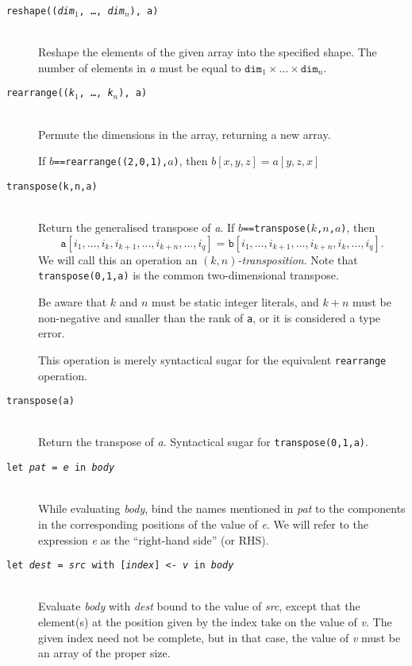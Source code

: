 \documentclass[oneside]{memoir}
\begin{document}
\begin{description}
  \item[\texttt{reshape((\textit{dim}$_{1}$, \ldots, \textit{dim}$_{n}$), a)}]\hfill\\
    Reshape the elements of the given array into the specified shape.
    The number of elements in \textit{a} must be equal to
    $\texttt{dim}_{1}\times\ldots\times\texttt{dim}_{n}$.

  \item[\texttt{rearrange((\textit{k}$_{1}$, \ldots, \textit{k}$_{n}$), a)}]\hfill\\
    Permute the dimensions in the array, returning a new array.

    If \texttt{$b$==rearrange((2,0,1),$a$)}, then $b[x,y,z] = a[y,z,x]$

  \item[\texttt{transpose(k,n,a)}]\hfill\\
    Return the generalised transpose of \textit{a}.  If
    \texttt{$b$==transpose($k$,$n$,$a$)}, then
    \[
    \texttt{a}[i_1, \ldots, i_k, i_{k+1}, \ldots, i_{k+n}, \ldots, i_q ]
    =
    \texttt{b}[i_1 , \ldots, i_{k+1} , \ldots, i_{k+n}, i_k, \ldots, i_q ].
    \]
    We will call this an operation an \textit{$(k,n)$-transposition}.
    Note that \texttt{transpose(0,1,a)} is the common two-dimensional
    transpose.

    Be aware that $k$ and $n$ must be static integer literals, and
    $k+n$ must be non-negative and smaller than the rank of
    \texttt{a}, or it is considered a type error.

    This operation is merely syntactical sugar for the equivalent
    \texttt{rearrange} operation.

  \item[\texttt{transpose(a)}]\hfill\\
    Return the transpose of \textit{a}.  Syntactical sugar for
    \texttt{transpose(0,1,a)}.

  \item[\texttt{let \textit{pat} = \textit{e} in \textit{body}}]\hfill\\
    While evaluating \textit{body}, bind the names mentioned in
    \textit{pat} to the components in the corresponding positions of
    the value of \textit{e}.  We will refer to the expression
    \textit{e} as the ``right-hand side'' (or RHS).

  \item[\texttt{let \textit{dest} = \textit{src} with [\textit{index}] <- \textit{v} in \textit{body}}] \hfill \\
    Evaluate \textit{body} with \textit{dest} bound to the value of
    \textit{src}, except that the element(s) at the position given by
    the index take on the value of \textit{v}.  The given index need
    not be complete, but in that case, the value of \textit{v} must be
    an array of the proper size.


\end{description}
\end{document}
